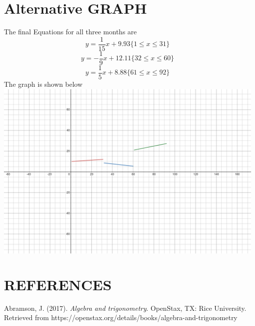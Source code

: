 \documentclass{article}
\begin{document}
\begin{itemize}
    
    \section*{Alternative GRAPH}
    The final Equations for all three months are 
    $${y=\frac{1}{15}x + 9.93  \{1\le x \le 31\}}$$
    $${y=-\frac{1}{9}x + 12.11 \{32\le x \le 60\}}$$
    $${y=\frac{1}{5}x + 8.88   \{61\le x \le 92\}}$$
    The graph is shown below\\
    \includegraphics[scale = 0.1]{alt-graph}


    \section*{REFERENCES}
    Abramson, J. (2017). \textit{Algebra and trigonometry}. OpenStax, TX: Rice University. Retrieved from https://openstax.org/details/books/algebra-and-trigonometry

\end{itemize}
\end{document}

